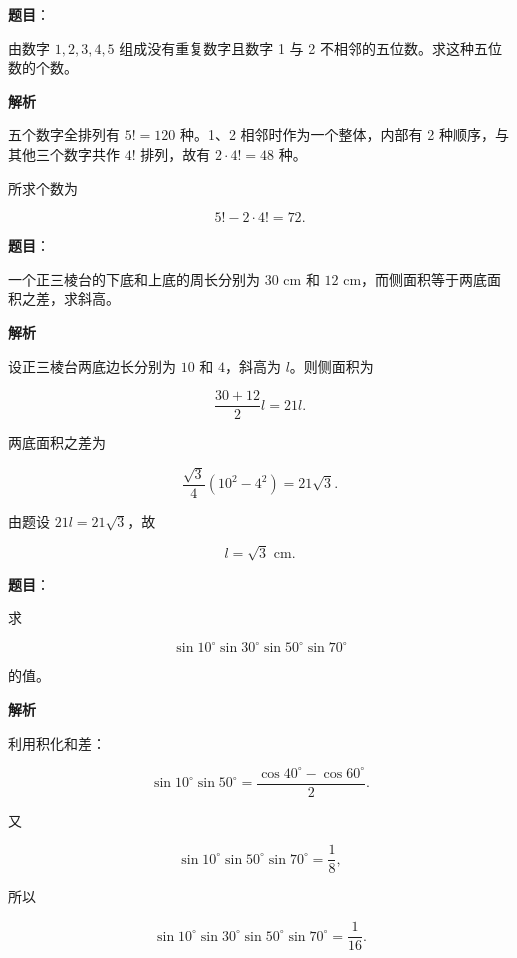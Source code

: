 \begin{answer}

\textbf{题目}：

由数字 $1,2,3,4,5$ 组成没有重复数字且数字 1 与 2 不相邻的五位数。求这种五位数的个数。

\textbf{解析}

五个数字全排列有 $5!=120$ 种。1、2 相邻时作为一个整体，内部有 2 种顺序，与其他三个数字共作 $4!$ 排列，故有 $2\cdot4!=48$ 种。

所求个数为

\nopagebreak[4]
\[
5!-2\cdot4!=72.
\]


\end{answer}
\begin{answer}

\textbf{题目}：

一个正三棱台的下底和上底的周长分别为 $30\text{ cm}$ 和 $12\text{ cm}$，而侧面积等于两底面积之差，求斜高。

\textbf{解析}

设正三棱台两底边长分别为 $10$ 和 $4$，斜高为 $l$。则侧面积为

\nopagebreak[4]
\[
\frac{30+12}{2}l=21l.
\]

两底面积之差为

\nopagebreak[4]
\[
\frac{\sqrt3}{4}(10^2-4^2)=21\sqrt3.
\]

由题设 $21l=21\sqrt3$，故

\nopagebreak[4]
\[
l=\sqrt3\text{ cm}.
\]


\end{answer}
\begin{answer}

\textbf{题目}：

求

\nopagebreak[4]
\[
\sin10^\circ\sin30^\circ\sin50^\circ\sin70^\circ
\]

的值。

\textbf{解析}

利用积化和差：

\nopagebreak[4]
\[
\sin10^\circ\sin50^\circ
=\frac{\cos40^\circ-\cos60^\circ}{2}.
\]

又

\nopagebreak[4]
\[
\sin10^\circ\sin50^\circ\sin70^\circ=\frac18,
\]

所以

\nopagebreak[4]
\[
\sin10^\circ\sin30^\circ\sin50^\circ\sin70^\circ
=\frac1{16}.
\]


\end{answer}
